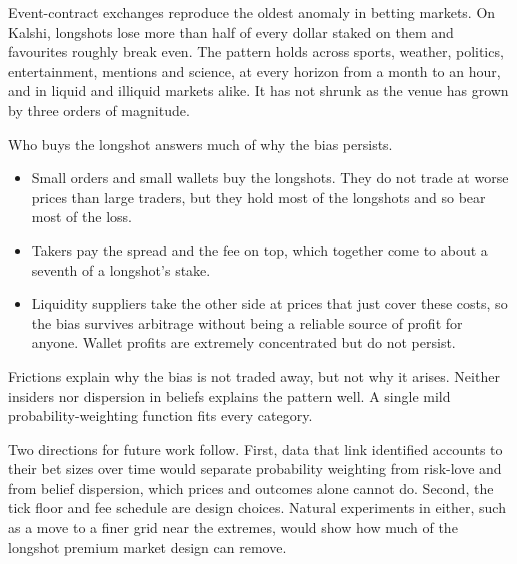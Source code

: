 Event-contract exchanges reproduce the oldest anomaly in betting markets. On Kalshi, longshots
lose more than half of every dollar staked on them and favourites roughly break even. The pattern
holds across sports, weather, politics, entertainment, mentions and science, at every horizon from
a month to an hour, and in liquid and illiquid markets alike. It has not shrunk as the venue has
grown by three orders of magnitude.

Who buys the longshot answers much of why the bias persists.
\begin{itemize}
  \item Small orders and small wallets buy the longshots. They do not trade at worse prices than
  large traders, but they hold most of the longshots and so bear most of the loss.
  \item Takers pay the spread and the fee on top, which together come to about a seventh of a
  longshot's stake.
  \item Liquidity suppliers take the other side at prices that just cover these costs, so the
  bias survives arbitrage without being a reliable source of profit for anyone. Wallet profits
  are extremely concentrated but do not persist.
\end{itemize}
Frictions explain why the bias is not traded away, but not why it arises. Neither insiders nor
dispersion in beliefs explains the pattern well. A single mild probability-weighting function
fits every category.

Two directions for future work follow. First, data that link identified accounts to their bet
sizes over time would separate probability weighting from risk-love and from belief dispersion,
which prices and outcomes alone cannot do. Second, the tick floor and fee schedule are design
choices. Natural experiments in either, such as a move to a finer grid near the extremes, would
show how much of the longshot premium market design can remove.
